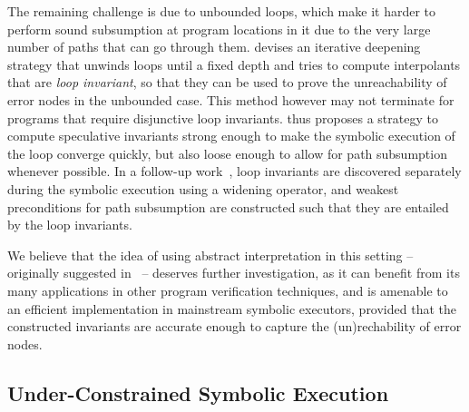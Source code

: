 {
The remaining challenge is due to unbounded loops, which make it harder to perform sound subsumption at program locations in it due to the very large number of paths that can go through them. \cite{McMillan10} devises an iterative deepening strategy that unwinds loops until a fixed depth and tries to compute interpolants that are {\em loop invariant}, so that they can be used to prove the unreachability of error nodes in the unbounded case. This method however may not terminate for programs that require disjunctive loop invariants. \cite{JNS11} thus proposes a strategy to compute speculative invariants strong enough to make the symbolic execution of the loop converge quickly, but also loose enough to allow for path subsumption whenever possible. In a follow-up work~\cite{JMN12}, loop invariants are discovered separately during the symbolic execution using a widening operator, and weakest preconditions for path subsumption are constructed such that they are entailed by the loop invariants.

We believe that the idea of using abstract interpretation in this setting -- originally suggested in~\cite{JSV09} -- deserves further investigation, as it can benefit from its many applications in other program verification techniques, and is amenable to an efficient implementation in mainstream symbolic executors, provided that the constructed invariants are accurate enough to capture the (un)rechability of error nodes.





}
\subsection{Under-Constrained Symbolic Execution} 
\label{under-constrained}

